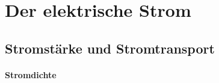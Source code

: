 \section{Der elektrische Strom}
\subsection{Stromstärke und Stromtransport}
\paragraph{Stromdichte}
